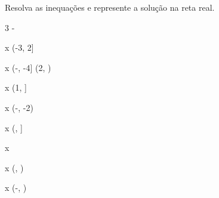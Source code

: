 \begin{exercicio}
    Resolva as inequações e represente a solução na reta real.
    \begin{mathlist}[2]
        \item {}    
        \item {}    
        \item {}   
        \item {}   
        \item {}   
        \item {}  
        \item 3 -   
        \item {}  
        \item {}     
        \item {}   
        \item {} 
        \item {}  
        \item {}    
    \end{mathlist}
    \begin{answers}
        \begin{mathlist}[2]
            \item x \in \left(-3, 2\right]
            \item x \in \left(-\infty, -4\right] \cup \left(2, \infty\right)
            \item x \in \left(1, \right]
            \item x \in \left(-\infty, -2\right) \cup {}
            \item x \in \left(, \right]
            \item x \in \left[-3, -2\right)
            \item x \in \left[\sfrac{2}{3}, \sfrac{5}{2}\right)
            \item x \in \left(4, 8\right]
            \item x \in {} \cup \left(, \infty\right)
            \item x \in \left(-\infty, \right) \cup {}
        \end{mathlist}
    \end{answers}
\end{exercicio}

